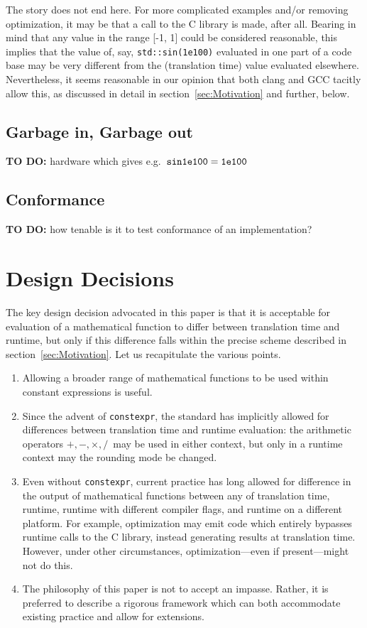 \documentclass[prd,twocolumn,amsmath,amssymb,nofootinbib,eqsecnum]{revtex4-1}
\newcommand{\constexpr}{\code{constexpr}\xspace}
\newcommand{\code}[1]{{\tt #1}}
\newcommand{\Operators}{\ensuremath{+,-,\times,/}}
\newcommand{\sect}[1]{section~\ref{sec:#1}}
\begin{document}
The story does not end here. For more complicated examples and/or removing optimization, it may be that a call to the C library is made, after all. Bearing in mind that any value in the range [-1, 1] could be considered reasonable, this implies that the value of, say, \code{std::sin(1e100)} evaluated in one part of a code base may be very different from the (translation time) value evaluated elsewhere. 
Nevertheless, it seems reasonable in our opinion that both clang and GCC tacitly allow this, as discussed in detail in \sect{Motivation} and further, below.


\subsection{Garbage in, Garbage out}

{\bf TO DO:} hardware which gives e.g.\ $\code{sin 1e100 = 1e100}$

\subsection{Conformance}

{\bf TO DO:} how tenable is it to test conformance of an implementation?


\section{Design Decisions}

The key design decision advocated in this paper is that it is acceptable for evaluation of a mathematical function to differ between translation time and runtime, but only if this difference falls within the precise scheme described in \sect{Motivation}. Let us recapitulate the various points.

\begin{enumerate}
	\item Allowing a broader range of mathematical functions to be used within constant expressions is useful.
	
	\item Since the advent of \constexpr, the standard has implicitly allowed for differences between translation time and runtime evaluation: the arithmetic operators \Operators\ may be used in either context, but only in a runtime context may the rounding mode be changed.
	
	\item Even without \constexpr, current practice has long allowed for difference in the output of mathematical functions between any of translation time, runtime, runtime with different compiler flags, and runtime on a different platform. For example, optimization may emit code which entirely bypasses runtime calls to the C library, instead generating results at translation time. However, under other circumstances, optimization---even if present---might not do this.
	
	\item The philosophy of this paper is not to accept an impasse. Rather, it is preferred to describe a rigorous framework which can both accommodate existing practice and allow for extensions.
\end{enumerate}
\end{document}
